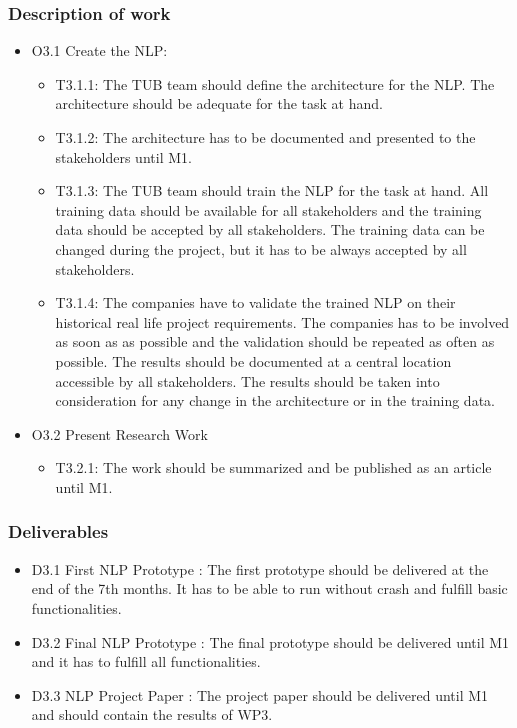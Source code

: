 \subsubsection{Description of work}
\begin{itemize}
	\item O3.1 Create the \gls{NLP}:
	\begin{itemize}
		\item T3.1.1: The \gls{TUB} team should define the architecture for the \gls{NLP}. The architecture should be adequate for the task at hand.
		\item T3.1.2: The architecture has to be documented and presented to the stakeholders until M1.
		\item T3.1.3: The \gls{TUB} team should train the \gls{NLP} for the task at hand. All training data should be available for all stakeholders and the training data should be accepted by all stakeholders. The training data can be changed during the project, but it has to be always accepted by all stakeholders.
		\item T3.1.4: The companies have to validate the trained \gls{NLP} on their historical real life project requirements. The companies has to be involved as soon as as possible and the validation should be repeated as often as possible. The results should be documented at a central location accessible by all stakeholders. The results should be taken into consideration for any change in the architecture or in the training data.  
	\end{itemize}
	\item O3.2 Present Research Work
	\begin{itemize}
		\item T3.2.1: The work should be summarized and be published as an article until M1. 
	\end{itemize}
\end{itemize}
\subsubsection{Deliverables}
\begin{itemize}
	\item D3.1 First \gls{NLP} Prototype : The first prototype should be delivered at the end of the 7th months. It has to be able to run without crash and fulfill basic functionalities.
	\item D3.2 Final \gls{NLP} Prototype : The final prototype should be delivered until M1 and it has to fulfill all functionalities.
	\item D3.3 \gls{NLP} Project Paper : The project paper should be delivered until M1 and should contain the results of WP3.
\end{itemize}